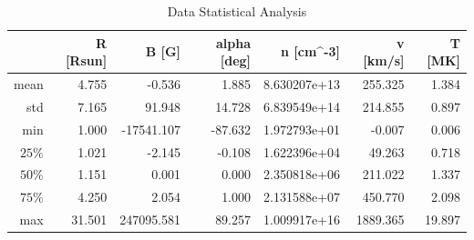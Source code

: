 \begin{table}[h]
    \caption{Data Statistical Analysis}
    \label{tab:data_stats}
    \begin{tabular}{@{}rrrrrrr@{}}
    \toprule
    \textbf{} & \textbf{R {[}Rsun{]}} & \textbf{B {[}G{]}} & \textbf{alpha {[}deg{]}} & \textbf{n {[}cm\textasciicircum{}-3{]}} & \textbf{v {[}km/s{]}} & \textbf{T {[}MK{]}} \\ \midrule
    mean      & 4.755                 & -0.536             & 1.885                    & 8.630207e+13                            & 255.325               & 1.384               \\
    std       & 7.165                 & 91.948             & 14.728                   & 6.839549e+14                            & 214.855               & 0.897               \\
    min       & 1.000                 & -17541.107         & -87.632                  & 1.972793e+01                            & -0.007                & 0.006               \\
    $25\%$    & 1.021                 & -2.145             & -0.108                   & 1.622396e+04                            & 49.263                & 0.718               \\
    $50\%$    & 1.151                 & 0.001              & 0.000                    & 2.350818e+06                            & 211.022               & 1.337               \\
    $75\%$    & 4.250                 & 2.054              & 1.000                    & 2.131588e+07                            & 450.770               & 2.098               \\
    max       & 31.501                & 247095.581         & 89.257                   & 1.009917e+16                            & 1889.365              & 19.897              \\ \bottomrule
    \end{tabular}
\end{table}